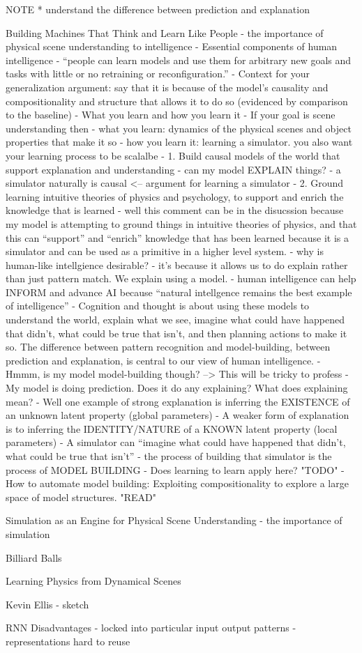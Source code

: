 NOTE
    * understand the difference between prediction and explanation

Building Machines That Think and Learn Like People
    - the importance of physical scene understanding to intelligence
    - Essential components of human intelligence
        - ``people can learn models and use them for arbitrary new goals and tasks with little or no retraining or reconfiguration.''
            - Context for your generalization argument: say that it is because of the model's causality and compositionality and structure that allows it to do so (evidenced by comparison to the baseline)
        - What you learn and how you learn it
            - If your goal is scene understanding then
                - what you learn: dynamics of the physical scenes and object properties that make it so
                - how you learn it: learning a simulator. you also want your learning process to be scalalbe
        - 1. Build causal models of the world that support explanation and understanding
            - can my model EXPLAIN things?
            - a simulator naturally is causal <-- argument for learning a simulator
        - 2. Ground learning intuitive theories of physics and psychology, to support and enrich the knowledge that is learned
            - well this comment can be in the disucssion because my model is attempting to ground things in intuitive theories of physics, and that this can ``support'' and ``enrich'' knowledge that has been learned because it is a simulator and can be used as a primitive in a higher level system.
    - why is human-like intellgience desirable?
        - it's because it allows us to do explain rather than just pattern match. We explain using a model.
        - human intelligence can help INFORM and advance AI because ``natural intellgence remains the best example of intelligence''
    - Cognition and thought is about using these models to understand the world, explain what we see, imagine what could have happened that didn’t, what could be true that isn’t, and then planning actions to make it so. The difference between pattern recognition and model-building, between prediction and explanation, is central to our view of human intelligence.
        - Hmmm, is my model model-building though?  --> This will be tricky to profess
        - My model is doing prediction. Does it do any explaining? What does explaining mean?
            - Well one example of strong explanation is inferring the EXISTENCE of an unknown latent property (global parameters)
            - A weaker form of explanation is to inferring the IDENTITY/NATURE of a KNOWN latent property (local parameters)
        - A simulator can ``imagine what could have happened that didn’t, what could be true that isn’t''
        - the process of building that simulator is the process of MODEL BUILDING
    - Does learning to learn apply here? "TODO"
    - How to automate model building: Exploiting compositionality to explore a large space of model structures. "READ"


Simulation as an Engine for Physical Scene Understanding
    - the importance of simulation


Billiard Balls


Learning Physics from Dynamical Scenes


Kevin Ellis
    - sketch



RNN Disadvantages
    - locked into particular input output patterns
    - representations hard to reuse


